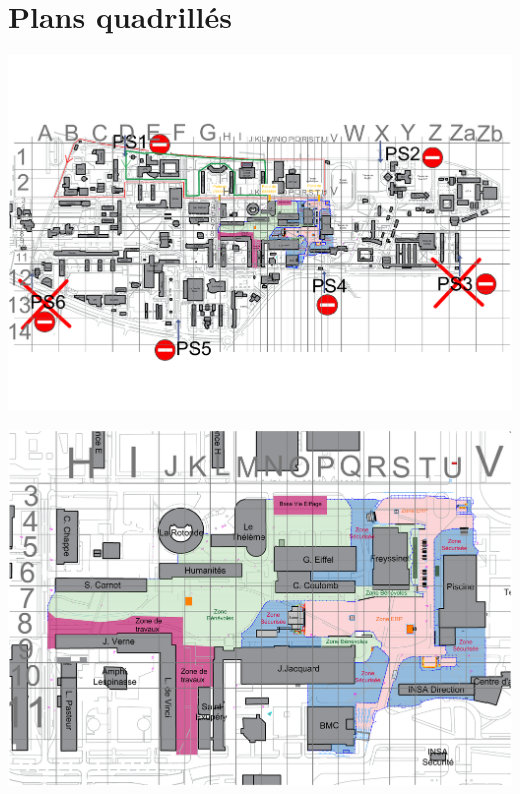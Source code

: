 \documentclass[hidelinks, paper=a4, fontsize=13pt]{report}
\begin{document}
\section{Plans quadrillés}
	\begin{center}\includegraphics[width=.95\textheight, angle=90]{Exports/Plan_24h_45eme-Quadrillage_campus}\end{center}
	\begin{center}\includegraphics[width=.95\textheight, angle=90]{Exports/Plan_24h_45eme-Quadrillage_zoom}\end{center}
\end{document}
